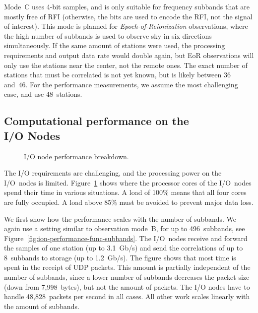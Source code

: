 \documentclass{sig-alternate}
\begin{document}
Mode~\textsf{C} uses 4-bit samples, and is only suitable for frequency
subbands that are mostly free of RFI (otherwise, the bits are used to encode
the RFI, not the signal of interest).
This mode is planned for \emph{Epoch-of-Reionization} observations, where the high number of subbands
is used to observe sky in six directions simultaneously.
If the same amount of stations were used, the processing requirements and
output data rate would double again, but EoR observations will only use the
stations near the center, not the remote ones.
The exact number of stations that must be correlated is not yet known, but is
likely between 36 and~46.
For the performance measurements, we assume the most challenging case, and use 48~stations.


\subsection{Computational performance on the \\ I/O Nodes}
\label{sec:ION-performance}

\begin{figure}[ht]
\hfill
{}
\caption{I/O node performance breakdown.}
\label{fig:ion-performance}
\end{figure}

The I/O requirements are challenging, and the processing power on the I/O~nodes
is limited.
Figure~\ref{fig:ion-performance} shows where the processor cores of the
I/O~nodes spend their time in various situations.
A load of 100\% means that all four cores are fully occupied.
A load above 85\% must be avoided to prevent major data loss.

We first show how the performance scales with the number of subbands.
We again use a setting similar to observation mode~\textsf{B}, for up to
496~subbands, see Figure~\ref{fig:ion-performance-func-subbands}.
The I/O~nodes receive and forward the samples
of one station (up to 3.1~Gb/s) and send the correlations of up to 8~subbands
to storage (up to 1.2~Gb/s).
The figure shows that most time is spent in the receipt of UDP packets.
This amount is partially independent of the number of subbands, since a lower
number of subbands decreases the packet size (down from 7,998~bytes), but not
the amount of packets. The I/O nodes have to handle 48,828~packets per second in all cases.
All other work scales linearly with the amount of subbands.
\end{document}
